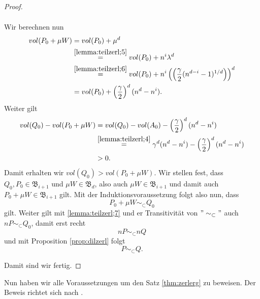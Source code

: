 \documentclass[11pt,titlepage]{article}
\theoremstyle{definition}
\theoremstyle{remark}
\begin{document}
\begin{proof}
\begin{itemize}
\begin{align}
			\end{align}
			Wir berechnen nun
			\begin{align*}
				vol(P_0+\mu W) &= vol(P_0)+\mu^d \\
				&\overset{\ref{lemma:teilzerl;5}}{=} vol(P_0)+n^i\lambda^d \\
				&\overset{\ref{lemma:teilzerl;6}}{=}
				 vol(P_0)+n^i\left(\left(\frac{\gamma}{2}
				(n^{d-i}-1)^{1/d}\right)\right)^d \\
				&=vol(P_0)+\left(\frac{\gamma}{2}\right)^d (n^d-n^i).
			\end{align*}
			Weiter gilt 
			\begin{align*}
				vol(Q_0)-vol(P_0+\mu W)&= vol(Q_0)-vol(A_0)-
				\left(\frac{\gamma}{2}\right)^d (n^d-n^i) \\
				&\overset{\ref{lemma:teilzerl;4}}{=} \gamma^d(n^d-n^i)-
				\left(\frac{\gamma}{2}\right)^d (n^d-n^i) \\
				&>0.
			\end{align*}
			Damit erhalten wir $vol(Q_0)>vol(P_0+\mu W)$. Wir stellen fest, 
			dass $Q_0,P_0\in\mathfrak{B}_{i+1}$ und $\mu W\in \mathfrak{B}_d$, 
			also auch $\mu W\in\mathfrak{B}_{i+1}$ und damit auch 
			$P_0+\mu W\in\mathfrak{B}_{i+1}$ gilt. Mit der Induktionsvoraussetzung 
			folgt also nun, dass 
			\[P_0+\mu W\sim_{\subset} Q_0\]
			gilt. Weiter gilt mit \ref{lemma:teilzerl;7} und er Transitivität von $"\sim_{\subset}"$ auch $nP\sim_{\subset}Q_0$, 
			damit erst recht 
			\[nP\sim_{\subset}nQ\]
			und mit Proposition \ref{prop:dilzerl} folgt
			\[P\sim_{\subset}Q.\]
		\end{itemize}
	Damit sind wir fertig.
	\end{proof}
	
	Nun haben wir alle Voraussetzungen um den Satz \ref{thm:zerlerg} zu 
	beweisen. Der Beweis richtet sich nach \cite[Satz III]{Hadwiger}.
	
\end{document}
